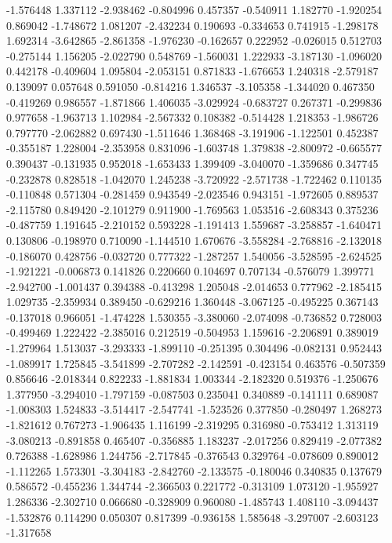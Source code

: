 -1.576448
1.337112
-2.938462
-0.804996
0.457357
-0.540911
1.182770
-1.920254
0.869042
-1.748672
1.081207
-2.432234
0.190693
-0.334653
0.741915
-1.298178
1.692314
-3.642865
-2.861358
-1.976230
-0.162657
0.222952
-0.026015
0.512703
-0.275144
1.156205
-2.022790
0.548769
-1.560031
1.222933
-3.187130
-1.096020
0.442178
-0.409604
1.095804
-2.053151
0.871833
-1.676653
1.240318
-2.579187
0.139097
0.057648
0.591050
-0.814216
1.346537
-3.105358
-1.344020
0.467350
-0.419269
0.986557
-1.871866
1.406035
-3.029924
-0.683727
0.267371
-0.299836
0.977658
-1.963713
1.102984
-2.567332
0.108382
-0.514428
1.218353
-1.986726
0.797770
-2.062882
0.697430
-1.511646
1.368468
-3.191906
-1.122501
0.452387
-0.355187
1.228004
-2.353958
0.831096
-1.603748
1.379838
-2.800972
-0.665577
0.390437
-0.131935
0.952018
-1.653433
1.399409
-3.040070
-1.359686
0.347745
-0.232878
0.828518
-1.042070
1.245238
-3.720922
-2.571738
-1.722462
0.110135
-0.110848
0.571304
-0.281459
0.943549
-2.023546
0.943151
-1.972605
0.889537
-2.115780
0.849420
-2.101279
0.911900
-1.769563
1.053516
-2.608343
0.375236
-0.487759
1.191645
-2.210152
0.593228
-1.191413
1.559687
-3.258857
-1.640471
0.130806
-0.198970
0.710090
-1.144510
1.670676
-3.558284
-2.768816
-2.132018
-0.186070
0.428756
-0.032720
0.777322
-1.287257
1.540056
-3.528595
-2.624525
-1.921221
-0.006873
0.141826
0.220660
0.104697
0.707134
-0.576079
1.399771
-2.942700
-1.001437
0.394388
-0.413298
1.205048
-2.014653
0.777962
-2.185415
1.029735
-2.359934
0.389450
-0.629216
1.360448
-3.067125
-0.495225
0.367143
-0.137018
0.966051
-1.474228
1.530355
-3.380060
-2.074098
-0.736852
0.728003
-0.499469
1.222422
-2.385016
0.212519
-0.504953
1.159616
-2.206891
0.389019
-1.279964
1.513037
-3.293333
-1.899110
-0.251395
0.304496
-0.082131
0.952443
-1.089917
1.725845
-3.541899
-2.707282
-2.142591
-0.423154
0.463576
-0.507359
0.856646
-2.018344
0.822233
-1.881834
1.003344
-2.182320
0.519376
-1.250676
1.377950
-3.294010
-1.797159
-0.087503
0.235041
0.340889
-0.141111
0.689087
-1.008303
1.524833
-3.514417
-2.547741
-1.523526
0.377850
-0.280497
1.268273
-1.821612
0.767273
-1.906435
1.116199
-2.319295
0.316980
-0.753412
1.313119
-3.080213
-0.891858
0.465407
-0.356885
1.183237
-2.017256
0.829419
-2.077382
0.726388
-1.628986
1.244756
-2.717845
-0.376543
0.329764
-0.078609
0.890012
-1.112265
1.573301
-3.304183
-2.842760
-2.133575
-0.180046
0.340835
0.137679
0.586572
-0.455236
1.344744
-2.366503
0.221772
-0.313109
1.073120
-1.955927
1.286336
-2.302710
0.066680
-0.328909
0.960080
-1.485743
1.408110
-3.094437
-1.532876
0.114290
0.050307
0.817399
-0.936158
1.585648
-3.297007
-2.603123
-1.317658
